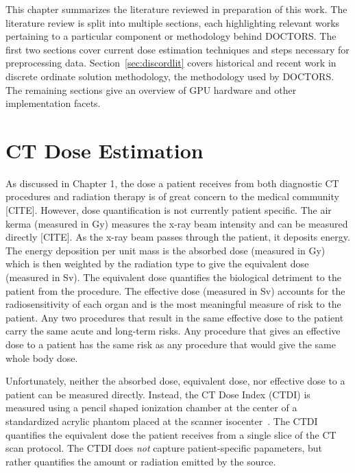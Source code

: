
This chapter summarizes the literature reviewed in preparation of this work. The literature review is split into multiple sections, each highlighting relevant works pertaining to a particular component or methodology behind DOCTORS. The first two sections cover current dose estimation techniques and steps necessary for preprocessing data. Section~\ref{sec:discordlit} covers historical and recent work in discrete ordinate solution methodology, the methodology used by DOCTORS. The remaining sections give an overview of GPU hardware and other implementation facets.

\section{CT Dose Estimation}
As discussed in Chapter 1, the dose a patient receives from both diagnostic CT procedures and radiation therapy is of great concern to the medical community [CITE]. However, dose quantification is not currently patient specific. The air kerma (measured in Gy) measures the x-ray beam intensity and can be measured directly [CITE]. As the x-ray beam passes through the patient, it deposits energy. The energy deposition per unit mass is the absorbed dose (measured in Gy) which is then weighted by the radiation type to give the equivalent dose (measured in Sv). The equivalent dose quantifies the biological detriment to the patient from the procedure. The effective dose (measured in Sv) accounts for the radiosensitivity of each organ and is the most meaningful measure of risk to the patient. Any two procedures that result in the same effective dose to the patient carry the same acute and long-term risks. Any procedure that gives an effective dose to a patient has the same risk as any procedure that would give the same whole body dose.

Unfortunately, neither the absorbed dose, equivalent dose, nor effective dose to a patient can be measured directly. Instead, the CT Dose Index (CTDI) is measured using a pencil shaped ionization chamber at the center of  a standardized acrylic phantom placed at the scanner isocenter~\citep{ref:hudaw}. The CTDI quantifies the equivalent dose the patient receives from a single slice of the CT scan protocol. The CTDI does \textit{not} capture patient-specific papameters, but rather quantifies the amount or radiation emitted by the source.

